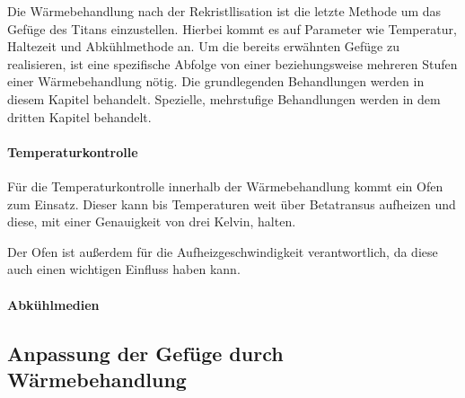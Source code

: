 \documentclass[a4paper, 11pt]{tubsreprt}
\begin{document}
Die Wärmebehandlung nach der Rekristllisation ist die letzte Methode um das Gefüge des Titans einzustellen. Hierbei kommt es auf Parameter wie Temperatur, Haltezeit und Abkühlmethode an. Um die bereits erwähnten Gefüge zu realisieren, ist eine spezifische Abfolge von einer beziehungsweise mehreren Stufen einer Wärmebehandlung nötig. Die grundlegenden Behandlungen werden in diesem Kapitel behandelt. Spezielle, mehrstufige Behandlungen werden in dem dritten Kapitel behandelt.
\paragraph{Temperaturkontrolle}
Für die Temperaturkontrolle innerhalb der Wärmebehandlung kommt ein Ofen zum Einsatz. Dieser kann bis Temperaturen weit über Betatransus aufheizen und diese, mit einer Genauigkeit von drei Kelvin, halten. 

Der Ofen ist außerdem für die Aufheizgeschwindigkeit verantwortlich, da diese auch einen wichtigen Einfluss haben kann.
\paragraph{Abkühlmedien}

\subsection*{Anpassung der Gefüge durch Wärmebehandlung}


\end{document}
